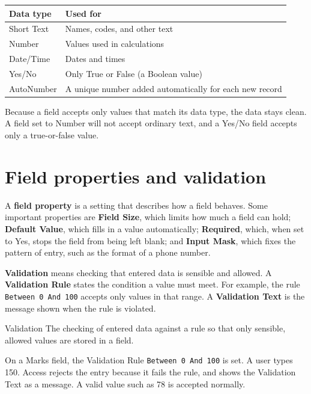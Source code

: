 \begin{center}
\begin{tabular}{p{}p{}}
\toprule
\textbf{Data type} & \textbf{Used for} \\
\midrule
Short Text & Names, codes, and other text \\
Number & Values used in calculations \\
Date/Time & Dates and times \\
Yes/No & Only True or False (a Boolean value) \\
AutoNumber & A unique number added automatically for each new record \\
\bottomrule
\end{tabular}
\end{center}

Because a field accepts only values that match its data type, the data stays
clean. A field set to Number will not accept ordinary text, and a Yes/No
field accepts only a true-or-false value.

\section{Field properties and validation}
A \textbf{field property} is a setting that describes how a field behaves.
Some important properties are \textbf{Field Size}, which limits how much a
field can hold; \textbf{Default Value}, which fills in a value
automatically; \textbf{Required}, which, when set to Yes, stops the field
from being left blank; and \textbf{Input Mask}, which fixes the pattern of
entry, such as the format of a phone number.

\textbf{Validation} means checking that entered data is sensible and allowed.
A \textbf{Validation Rule} states the condition a value must meet. For
example, the rule \texttt{Between 0 And 100} accepts only values in that
range. A \textbf{Validation Text} is the message shown when the rule is
violated.

\begin{definitionbox}{Validation}
The checking of entered data against a rule so that only sensible, allowed
values are stored in a field.
\end{definitionbox}

\begin{example}
On a Marks field, the Validation Rule \texttt{Between 0 And 100} is set. A
user types 150. Access rejects the entry because it fails the rule, and shows
the Validation Text as a message. A valid value such as 78 is accepted
normally.
\end{example}

